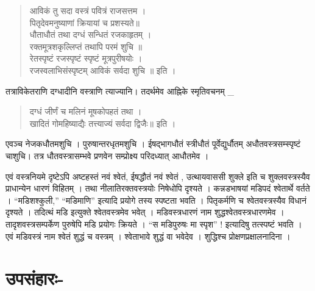 \begin{verse}
आविकं तु सदा वस्त्रं पवित्रं राजसत्तम । \\
पितृदेवमनुष्याणां क्रियायां च प्रशस्यते॥ \\
धौताधौतं तथा दग्धं सन्धितं रजकाहृतम् । \\
रक्तमूत्रशकृल्लिप्तं तथापि परमं शुचि ॥\\
रेतस्पृष्टं रजस्पृष्टं स्पृष्टं मूत्रपुरीषयोः ।\\
रजस्वलाभिसंस्पृष्टम् आविकं सर्वदा शुचि ॥ इति ।
\end{verse}
तत्राविकेतराणि दग्धादीनि वस्त्राणि त्याज्यानि। तदर्थमेव आह्निके स्मृतिवचनम् _
\begin{verse}
दग्धं जीर्णं च मलिनं मूषकोपहतं तथा । \\
खादितं गोमहिष्याद्यैः तत्त्याज्यं सर्वदा द्विजैः॥ इति । 
\end{verse}
एवञ्च नेजकधौतमशुचि । पुरुषान्तरधृतमशुचि । ईषद्भागधौतं स्त्रीधौतं पूर्वेद्युर्धौतम् अधौतवस्त्रसम्स्पृष्टं चाशुचि। तत्र धौतवस्त्रासम्भवे प्रणवेन सम्प्रोक्ष्य परिदध्यात् आधौतमेव । 

एवं वस्त्रनियमे दृष्टेऽपि अष्टहस्तं नवं श्वेतं, ईषद्धौतं नवं श्वेतं , उत्थायवाससी शुक्ले इति च शुक्लवस्त्रस्यैव प्राधान्येन धारणं विहितम् । तथा नीलातिरक्तवस्त्रयोः निषेधोपि दृश्यते । कन्नडभाषयां मडिपदं श्वेतार्थे वर्तते । “मडिशश्कुली,” “मडिमाणि” इत्यादि प्रयोगे तस्य स्पष्टता भवति । पितृकर्मणि च श्वेतवस्त्रस्यैव विधानं दृश्यते । तदित्थं मडि इत्युक्ते श्वेतवस्त्रमेव भवेत् । मडिवस्त्रधारणं नाम शुद्धश्वेतवस्त्रधारणमेव । तादृशवस्त्रसम्पर्केण पुरुषेपि मडि प्रयोगः क्रियते । “स मडिपुरुषः मा स्पृश” ! इत्यादिषु तत्स्पष्टं भवति । एवं मडिवस्त्रं नाम श्वेतं शुद्धं च वस्त्रम् । श्वेताभावे शुद्धं वा भवेदेव । शुद्धिश्च प्रोक्षणप्रक्षालनादिना ।

\section*{उपसंहारः-} 

